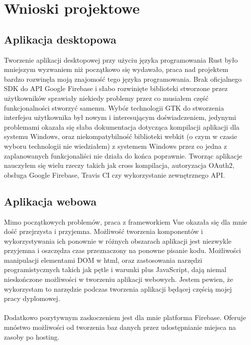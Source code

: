 \documentclass[12pt,a4paper]{article}
\begin{document}
	\newpage

	\section{Wnioski projektowe}
		\subsection{Aplikacja desktopowa}
	
		\indent Tworzenie aplikacji desktopowej przy użyciu języka programowania Rust było mniejszym wyzwaniem niż początkowo się wydawało, praca nad projektem bardzo
		rozwinęła moją znajomość tego języka programowania. Brak oficjalnego SDK do API Google Firebase i słabo rozwinięte biblioteki stworzone przez użytkowników
		sprawiały niekiedy problemy przez co musiałem część funkcjonalności stworzyć samemu. Wybór technologii GTK do stworzenia interfejsu użytkownika był nowym i interesującym
		doświadczeniem, jedynymi problemami okazała się słaba dokumentacja dotycząca kompilacji aplikacji dla systemu Windows, oraz niekompatybilność biblioteki webkit
		(o czym w czasie wyboru technologii nie wiedziałem) z systemem Windows przez co jedna z zaplanowanych funkcjonaliści nie działa do końca poprawnie. 
		Tworząc aplikacje nauczyłem się wielu rzeczy takich jak cross kompilacja, autoryzacja OAuth2, obsługa Google Firebase, Travis CI czy wykorzystanie zewnętrznego API.

		\subsection{Aplikacja webowa}	 
\indent Mimo początkowych problemów, praca z frameworkiem Vue okazała się dla mnie dość przejrzysta i przyjemna. Możliwość tworzenia komponentów i wykorzystywania ich ponownie w różnych obszarach aplikacji jest niezwykle przyjemna i oszczędza czas przeznaczony na ponowne pisanie kodu. Możliwości manipulacji elementami DOM w html, oraz zastosowania narzędzi programistycznych takich jak pętle i warunki plus JavaScript, dają niemal nieskończone możliwości w tworzeniu aplikacji webowych. Jestem pewien, że wykorzystam to narzędzie podczas tworzenia aplikacji będącej częścią mojej pracy dyplomowej. \\\\
Dodatkowo pozytywnym zaskoczeniem jest dla mnie platforma Firebase. Oferuje mnóstwo możliwości od tworzenia baz danych przez udostępnianie miejsca na zasoby po hosting. 
\end{document}
